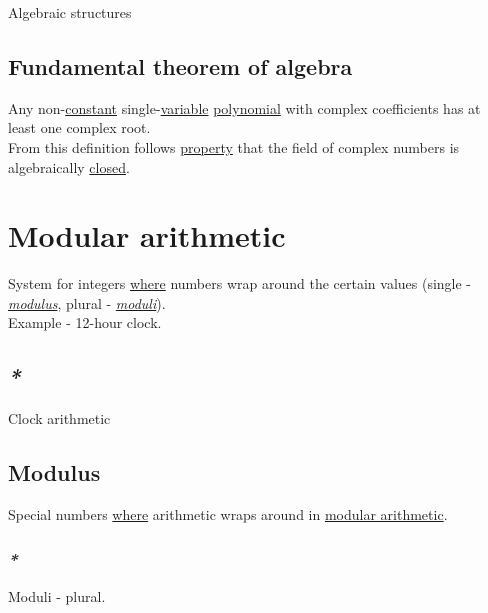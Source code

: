 \documentclass[a4paper,14pt,oneside]{book}
\begin{document}
\label{orgcc4705a}Algebraic structures\\

\subsection{\label{org6f84361}Fundamental theorem of algebra}
\label{sec:org2cc6d1b}
Any non-\hyperref[orgd0fe394]{constant} single-\hyperref[org4af7747]{variable} \hyperref[org11f79b4]{polynomial} with complex coefficients has at least one complex root.\\

From this definition follows \hyperref[org217f324]{property} that the field of complex numbers is algebraically \hyperref[orga47768f]{closed}.\\

\section{\label{org0f7c1c0}Modular arithmetic}
\label{sec:orgbe310a5}
System for integers \hyperref[org002404a]{where} numbers wrap around the certain values (single - \emph{\hyperref[orga6e968e]{modulus}}, plural - \emph{\hyperref[orgb8da786]{moduli}}).\\

Example - 12-hour clock.\\

\subsection{\emph{*}}
\label{sec:org163c58c}

\label{orgbda26bc}Clock arithmetic\\

\subsection{\label{orga6e968e}Modulus}
\label{sec:org68fae30}
Special numbers \hyperref[org002404a]{where} arithmetic wraps around in \hyperref[org0f7c1c0]{modular arithmetic}.\\

\subsubsection{\emph{*}}
\label{sec:org368a428}

\label{orgb8da786}Moduli - plural.\\
\end{document}
